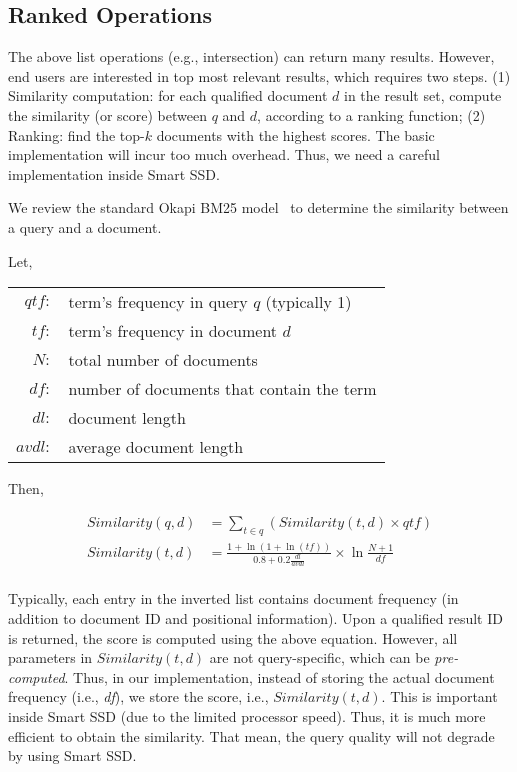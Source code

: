 \subsection{Ranked Operations}\label{sec:ranked}

The above list operations (e.g., intersection) can return many results. However, end users are interested in top most relevant results, which requires two steps. (1) Similarity computation: for each qualified document $d$ in the result set, compute the similarity (or score) between $q$ and $d$, according to a ranking function; (2) Ranking: find the top-$k$ documents with the highest scores. The basic implementation will incur too much overhead. Thus, we need a careful implementation inside Smart SSD.

We review the standard Okapi BM25 model~\cite{Robertson1994,Singhal01} to determine the similarity between a query and a document.

\noindent Let,

\begin{tabular}{rl}
$qtf:$& term's frequency in query $q$ (typically 1)\\
$tf:$ & term's frequency in document $d$\\
$N:$ & total number of documents\\
$df:$ & number of documents that contain the term\\
$dl:$ & document length\\
$avdl:$ & average document length\\
\end{tabular}

\noindent Then,

\begin{displaymath}
  \begin{aligned}
    Similarity(q,d)&=\sum_{t\in q}(Similarity(t,d) \times qtf)\\
    Similarity(t,d)&=\frac{1+\ln(1+\ln(tf))}{0.8 + 0.2\frac{dl}{avdl}} \times \ln\frac{N+1}{df}\\
  \end{aligned}
\end{displaymath}




Typically, each entry in the inverted list contains document frequency (in addition to document ID and positional information).
Upon a qualified result ID is returned, the score is computed using the above equation. However, all parameters in $Similarity(t,d)$ are not query-specific, which can be \emph{pre-computed}. Thus, in our implementation, instead of storing the actual document frequency (i.e., \emph{df}), we store the score, i.e., $Similarity(t,d)$. This is important inside Smart SSD (due to the limited processor speed). Thus, it is much more efficient to obtain the similarity. That mean, the query quality will not degrade by using Smart SSD.

